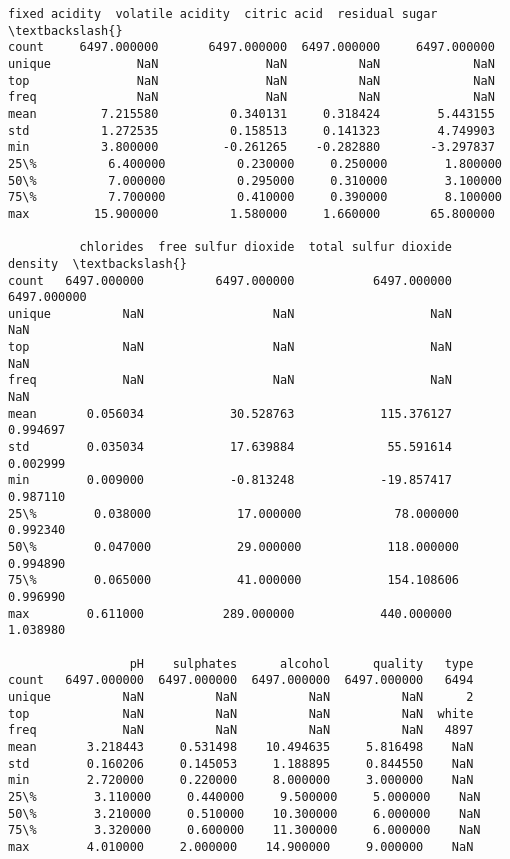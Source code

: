 \documentclass[11pt]{article}
\makeatletter
\newcommand{\boxspacing}{\kern\kvtcb@left@rule\kern\kvtcb@boxsep}
\newcommand{\prompt}[4]{
        {\ttfamily\llap{{\color{#2}[#3]:\hspace{3pt}#4}}\vspace{-\baselineskip}}
    }
\makeatother
\begin{document}
            \begin{tcolorbox}[breakable, size=fbox, boxrule=.5pt, pad at break*=1mm, opacityfill=0]
\prompt{Out}{outcolor}{20}{\boxspacing}
\begin{Verbatim}[commandchars=\\\{\}]
        fixed acidity  volatile acidity  citric acid  residual sugar  \textbackslash{}
count     6497.000000       6497.000000  6497.000000     6497.000000
unique            NaN               NaN          NaN             NaN
top               NaN               NaN          NaN             NaN
freq              NaN               NaN          NaN             NaN
mean         7.215580          0.340131     0.318424        5.443155
std          1.272535          0.158513     0.141323        4.749903
min          3.800000         -0.261265    -0.282880       -3.297837
25\%          6.400000          0.230000     0.250000        1.800000
50\%          7.000000          0.295000     0.310000        3.100000
75\%          7.700000          0.410000     0.390000        8.100000
max         15.900000          1.580000     1.660000       65.800000

          chlorides  free sulfur dioxide  total sulfur dioxide      density  \textbackslash{}
count   6497.000000          6497.000000           6497.000000  6497.000000
unique          NaN                  NaN                   NaN          NaN
top             NaN                  NaN                   NaN          NaN
freq            NaN                  NaN                   NaN          NaN
mean       0.056034            30.528763            115.376127     0.994697
std        0.035034            17.639884             55.591614     0.002999
min        0.009000            -0.813248            -19.857417     0.987110
25\%        0.038000            17.000000             78.000000     0.992340
50\%        0.047000            29.000000            118.000000     0.994890
75\%        0.065000            41.000000            154.108606     0.996990
max        0.611000           289.000000            440.000000     1.038980

                 pH    sulphates      alcohol      quality   type
count   6497.000000  6497.000000  6497.000000  6497.000000   6494
unique          NaN          NaN          NaN          NaN      2
top             NaN          NaN          NaN          NaN  white
freq            NaN          NaN          NaN          NaN   4897
mean       3.218443     0.531498    10.494635     5.816498    NaN
std        0.160206     0.145053     1.188895     0.844550    NaN
min        2.720000     0.220000     8.000000     3.000000    NaN
25\%        3.110000     0.440000     9.500000     5.000000    NaN
50\%        3.210000     0.510000    10.300000     6.000000    NaN
75\%        3.320000     0.600000    11.300000     6.000000    NaN
max        4.010000     2.000000    14.900000     9.000000    NaN
\end{Verbatim}
\end{tcolorbox}
        
\end{document}
